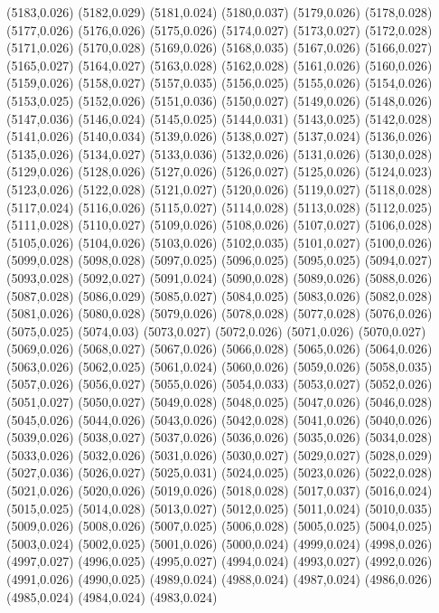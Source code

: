 (5183,0.026)
(5182,0.029)
(5181,0.024)
(5180,0.037)
(5179,0.026)
(5178,0.028)
(5177,0.026)
(5176,0.026)
(5175,0.026)
(5174,0.027)
(5173,0.027)
(5172,0.028)
(5171,0.026)
(5170,0.028)
(5169,0.026)
(5168,0.035)
(5167,0.026)
(5166,0.027)
(5165,0.027)
(5164,0.027)
(5163,0.028)
(5162,0.028)
(5161,0.026)
(5160,0.026)
(5159,0.026)
(5158,0.027)
(5157,0.035)
(5156,0.025)
(5155,0.026)
(5154,0.026)
(5153,0.025)
(5152,0.026)
(5151,0.036)
(5150,0.027)
(5149,0.026)
(5148,0.026)
(5147,0.036)
(5146,0.024)
(5145,0.025)
(5144,0.031)
(5143,0.025)
(5142,0.028)
(5141,0.026)
(5140,0.034)
(5139,0.026)
(5138,0.027)
(5137,0.024)
(5136,0.026)
(5135,0.026)
(5134,0.027)
(5133,0.036)
(5132,0.026)
(5131,0.026)
(5130,0.028)
(5129,0.026)
(5128,0.026)
(5127,0.026)
(5126,0.027)
(5125,0.026)
(5124,0.023)
(5123,0.026)
(5122,0.028)
(5121,0.027)
(5120,0.026)
(5119,0.027)
(5118,0.028)
(5117,0.024)
(5116,0.026)
(5115,0.027)
(5114,0.028)
(5113,0.028)
(5112,0.025)
(5111,0.028)
(5110,0.027)
(5109,0.026)
(5108,0.026)
(5107,0.027)
(5106,0.028)
(5105,0.026)
(5104,0.026)
(5103,0.026)
(5102,0.035)
(5101,0.027)
(5100,0.026)
(5099,0.028)
(5098,0.028)
(5097,0.025)
(5096,0.025)
(5095,0.025)
(5094,0.027)
(5093,0.028)
(5092,0.027)
(5091,0.024)
(5090,0.028)
(5089,0.026)
(5088,0.026)
(5087,0.028)
(5086,0.029)
(5085,0.027)
(5084,0.025)
(5083,0.026)
(5082,0.028)
(5081,0.026)
(5080,0.028)
(5079,0.026)
(5078,0.028)
(5077,0.028)
(5076,0.026)
(5075,0.025)
(5074,0.03)
(5073,0.027)
(5072,0.026)
(5071,0.026)
(5070,0.027)
(5069,0.026)
(5068,0.027)
(5067,0.026)
(5066,0.028)
(5065,0.026)
(5064,0.026)
(5063,0.026)
(5062,0.025)
(5061,0.024)
(5060,0.026)
(5059,0.026)
(5058,0.035)
(5057,0.026)
(5056,0.027)
(5055,0.026)
(5054,0.033)
(5053,0.027)
(5052,0.026)
(5051,0.027)
(5050,0.027)
(5049,0.028)
(5048,0.025)
(5047,0.026)
(5046,0.028)
(5045,0.026)
(5044,0.026)
(5043,0.026)
(5042,0.028)
(5041,0.026)
(5040,0.026)
(5039,0.026)
(5038,0.027)
(5037,0.026)
(5036,0.026)
(5035,0.026)
(5034,0.028)
(5033,0.026)
(5032,0.026)
(5031,0.026)
(5030,0.027)
(5029,0.027)
(5028,0.029)
(5027,0.036)
(5026,0.027)
(5025,0.031)
(5024,0.025)
(5023,0.026)
(5022,0.028)
(5021,0.026)
(5020,0.026)
(5019,0.026)
(5018,0.028)
(5017,0.037)
(5016,0.024)
(5015,0.025)
(5014,0.028)
(5013,0.027)
(5012,0.025)
(5011,0.024)
(5010,0.035)
(5009,0.026)
(5008,0.026)
(5007,0.025)
(5006,0.028)
(5005,0.025)
(5004,0.025)
(5003,0.024)
(5002,0.025)
(5001,0.026)
(5000,0.024)
(4999,0.024)
(4998,0.026)
(4997,0.027)
(4996,0.025)
(4995,0.027)
(4994,0.024)
(4993,0.027)
(4992,0.026)
(4991,0.026)
(4990,0.025)
(4989,0.024)
(4988,0.024)
(4987,0.024)
(4986,0.026)
(4985,0.024)
(4984,0.024)
(4983,0.024)
